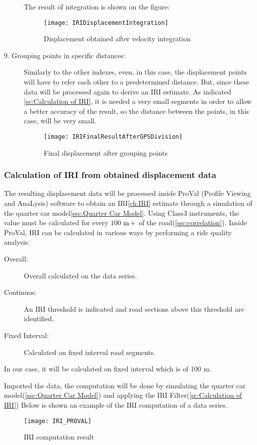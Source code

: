 \documentclass[tesi]{subfiles}
\begin{document}
\begin{description}
The result of integration is shown on the figure:

\begin{figure}[H]
\centering
\texttt{[image: IRIDisplacementIntegration]}
\caption{Displacement obtained after velocity integration}
\end{figure}
\item[9. Grouping points in specific distances:] Similarly to the other indexes, even, in this case, the displacement points will have to refer each other to a predetermined distance.
But, since these data will be processed again to derive an IRI estimate.
As indicated \ref{sc:Calculation of IRI}, it is needed a very small segments in order to allow a better accuracy of the result, so the distance between the points, in this case, will be very small.

\begin{figure}[H]
\centering
\texttt{[image: IRIFinalResultAfterGPSDivision]}
\caption{Final displacement after grouping points}
\end{figure}

\end{description}


\subsubsection{Calculation of IRI from obtained displacement data}
The resulting displacement data will be processed inside ProVal (Profile Viewing and AnaLysis) software to obtain an IRI\ref{ch:IRI} estimate through a simulation of the quarter car model\ref{ssc:Quarter Car Model}.
Using Class3 instruments, the value must be calculated for every $100$ $\si{\meter}\thinspace +$ of the road(\ref{ssc:correlation}).
Inside ProVal, IRI can be calculated in various ways by performing a ride quality analysis:
\begin{description}
\item[Overall:] Overall calculated on the data series.
\item[Continuos:] An IRI threshold is indicated and road sections above this threshold are identified.
\item[Fixed Interval:] Calculated on fixed interval road	 segments.
\end{description}
In our case, it will be calculated on fixed interval which is of $100$ $\si{\meter}$.

Imported the data, the computation will be done by simulating the quarter car model(\ref{ssc:Quarter Car Model}) and applying the IRI Filter(\ref{sc:Calculation of IRI})
Below is shown an example of the IRI computation of a data series.
\begin{figure}[H]
\centering
\texttt{[image: IRI\_PROVAL]}
\caption{IRI computation result}
\end{figure}\label{fig:IRI computation result}
\end{document}
